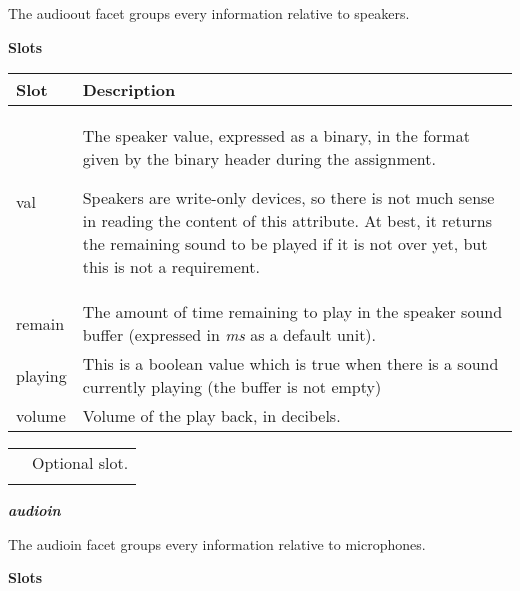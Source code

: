 \documentclass[a4paper]{article}
\begin{document}
{\sffamily
The audioout facet groups every information relative to speakers. }

{\sffamily\bfseries
Slots}

\begin{flushleft}
\tablehead{}
\begin{supertabular}{|m{3.293cm}|m{11.997cm}|}
\hline
{}\sffamily\bfseries Slot &
\sffamily\bfseries Description\\\hline
{} val &
{\sffamily The speaker value, expressed as a
binary, in the format given by the binary header during the
assignment.}

\sffamily Speakers are write-only devices, so
there is not much sense in reading the content of this attribute. At
best, it returns the remaining sound to be played if it is not over
yet, but this is not a requirement.\\\hline
{} remain &
 \foreignlanguage{english}{\textsf{The amount of
time remaining to play in the speaker sound buffer (expressed in
}}\foreignlanguage{english}{\textsf{\textit{ms}}}\foreignlanguage{english}{\textsf{
as a default unit).}}\\\hline
{} playing &
\sffamily This is a boolean value which is true
when there is a sound currently playing (the buffer is not
empty)\\\hline
{} volume &
\sffamily Volume of the play back, in
decibels.\\\hline
\end{supertabular}
\end{flushleft}
\begin{flushleft}
\tablehead{}
\begin{supertabular}{|m{1.717cm}|m{10.464cm}}
\hhline{-~}
 &
 Optional slot.\\\hhline{-~}
\end{supertabular}
\end{flushleft}
{\sffamily\bfseries\itshape
audioin}

{\sffamily
The audioin facet groups every information relative to microphones. }

{\sffamily\bfseries
Slots}
\end{document}
